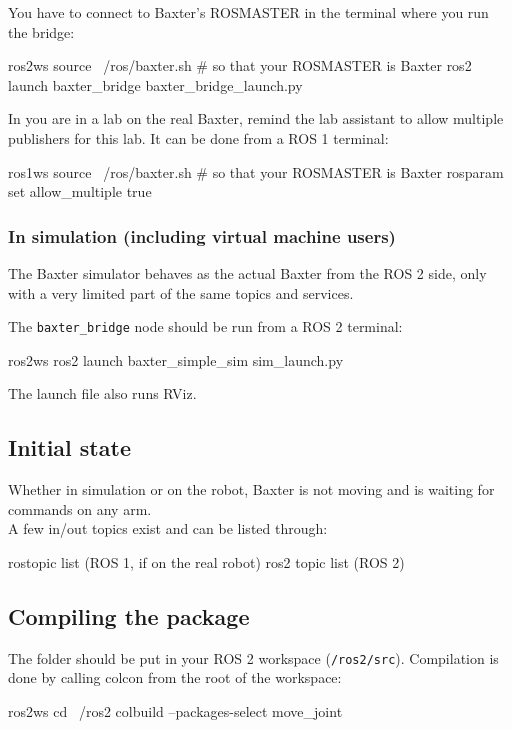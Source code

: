 \documentclass{ecnreport}
\begin{document}
You have to connect to Baxter's ROSMASTER in the terminal where you run the bridge:
\begin{bashcodelarge}
 ros2ws
 source ~/ros/baxter.sh # so that your ROSMASTER is Baxter
 ros2 launch baxter_bridge baxter_bridge_launch.py
\end{bashcodelarge}

In you are in a lab on the real Baxter, remind the lab assistant to allow multiple publishers for this lab.
It can be done from a ROS 1 terminal:
\begin{bashcodelarge}
 ros1ws
 source ~/ros/baxter.sh # so that your ROSMASTER is Baxter
 rosparam set allow_multiple true
\end{bashcodelarge}

\subsubsection{In simulation (including virtual machine users)}

The Baxter simulator behaves as the actual Baxter from the ROS 2 side, only with a very limited part of the same topics and services. 

The \texttt{baxter\_bridge} node should be run from a ROS 2 terminal:
\begin{bashcodelarge}
ros2ws
ros2 launch baxter_simple_sim sim_launch.py
\end{bashcodelarge}
The launch file also runs RViz.

\subsection{Initial state}

Whether in simulation or on the robot, Baxter is not moving and is waiting for commands on any arm.\\
A few in/out topics exist and can be listed through:
\begin{bashcodelarge}
rostopic list (ROS 1, if on the real robot)
ros2 topic list (ROS 2)
\end{bashcodelarge}

\subsection{Compiling the package}

The folder should be put in your ROS 2 workspace (\texttt{\texttilde/ros2/src}). Compilation is done by calling colcon from the root of the workspace:
\begin{bashcodelarge}
 ros2ws
 cd ~/ros2
 colbuild --packages-select move_joint
\end{bashcodelarge}
\end{document}
